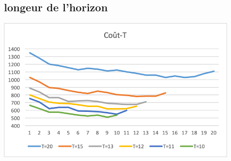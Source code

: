 \documentclass[12pt,a4paper]{article}
\begin{document}
\subsection{longeur de l'horizon}
\begin{minipage}[r]{.99\linewidth}
	\center\includegraphics[width=12cm]{img/change/t-cout.png}
	\begin{center}
	\end{center}
\end{minipage}
\end{document}
